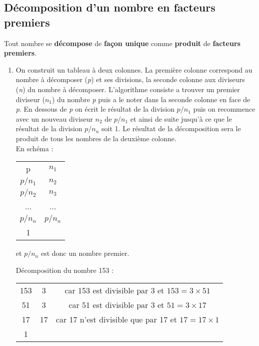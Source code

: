 \documentclass[a4paper,dvipsnames]{article}
\begin{document}
\subsection{Décomposition d'un nombre en facteurs premiers}

\begin{Pp}
Tout nombre se \textbf{décompose} de \textbf{façon unique} comme \textbf{produit} de \textbf{facteurs premiers}.
\end{Pp}

\begin{Mt}
\begin{enumerate}
\item On construit un tableau à deux colonnes. La première colonne correspond au nombre à décomposer (\textit{p}) et ses divisions, la seconde colonne aux diviseurs (\textit{n}) du nombre à décomposer. L'algorithme consiste a trouver un premier diviseur (\(n_1\)) du nombre \textit{p} puis a le noter dans la seconde colonne en face de \textit{p}. En dessous de \textit{p} on écrit le résultat de la division \(p/n_1\) puis on recommence avec un nouveau diviseur \(n_2\) de \(p/n_1\) et ainsi de suite jusqu'à ce que le résultat de la division \(p/n_n\) soit 1. Le résultat de la décomposition sera le produit de tous les nombres de la deuxième colonne.\\

En schéma :
\begin{tabular}{c|c}
    p & \(n_1\) \\
    \(p/n_1\) & \(n_2\) \\
    \(p/n_2\) & \(n_3\) \\
    ... & ... \\
    \(p/n_n\) & \(p/n_n\) \\
    1 &
\end{tabular} et \(p/n_n\) est donc un nombre premier.\\
 
\begin{Ex}
Décomposition du nombre 153 :
\begin{center}
\begin{tabular}{c|cc}
    153 & 3 & car 153 est divisible par 3 et \(153=3\times51\)\\
    51 & 3 & car 51 est divisible par 3 et \(51=3\times17\)\\
    17 & 17 & car 17 n'est divisible que par 17 et \(17=17\times1\)\\
    1 & 
\end{tabular}
\end{center}
\end{Ex} 


\end{enumerate}
\end{Mt}
\end{document}
